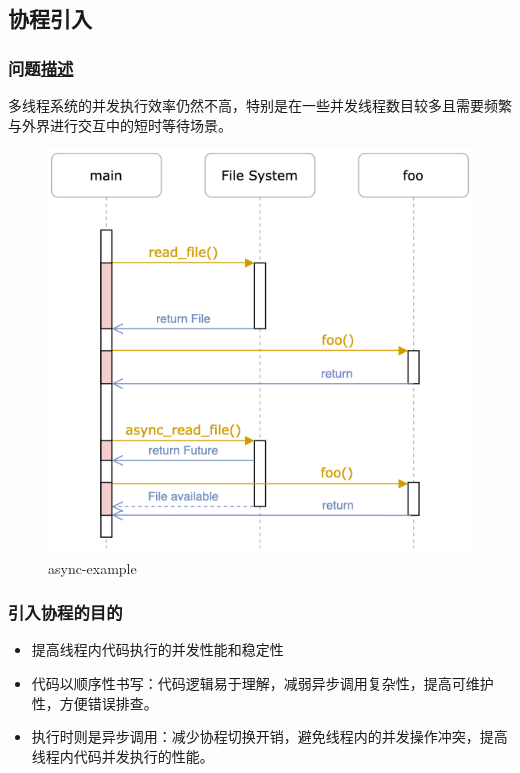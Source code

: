 \subsection{协程引入}
% 
\begin{frame}[fragile]
    \frametitle{问题\href{https://os.phil-opp.com/async-await/\#example}{描述}}
% 
多线程系统的并发执行效率仍然不高，特别是在一些并发线程数目较多且需要频繁与外界进行交互中的短时等待场景。
% 

  \begin{figure}
    \centering
    \includegraphics[width=0.5\linewidth]{figs/async-example.png}
    \caption{async-example}
  \end{figure}



% 

\end{frame}
\begin{frame}[fragile]
    \frametitle{引入协程的目的}

    \begin{itemize}
        \item 提高线程内代码执行的并发性能和稳定性
        \item 代码以顺序性书写：代码逻辑易于理解，减弱异步调用复杂性，提高可维护性，方便错误排查。
        \item 执行时则是异步调用：减少协程切换开销，避免线程内的并发操作冲突，提高线程内代码并发执行的性能。
    \end{itemize}
\end{frame}
% 
